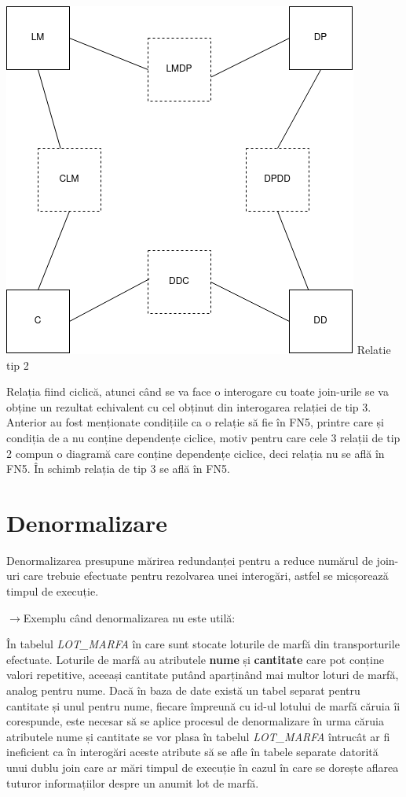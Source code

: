 \documentclass[12pt, a4paper]{article}
\begin{document}
\includegraphics[width=\textwidth]{fn5_rel_2.png}
\label{rel2}
\centering Relatie tip 2

\justifying Relația fiind ciclică, atunci când se va face o interogare cu toate join-urile se va obține un rezultat echivalent cu cel obținut din interogarea relației de tip 3. Anterior au fost menționate condițiile ca o relație să fie în FN5, printre care și condiția de a nu conține dependențe ciclice, motiv pentru care cele 3 relații de tip 2 compun o diagramă care conține dependențe ciclice, deci relația nu se află în FN5. În schimb relația de tip 3 se află în FN5.

\section{Denormalizare}
Denormalizarea presupune mărirea redundanței pentru a reduce numărul de join-uri care trebuie efectuate pentru rezolvarea unei interogări, astfel se micșorează timpul de execuție.

$\rightarrow$Exemplu când denormalizarea nu este utilă:

În tabelul \emph{LOT\_MARFA} în care sunt stocate loturile de marfă din transporturile efectuate. Loturile de marfă au atributele \textbf{nume} și \textbf{cantitate} care pot conține valori repetitive, aceeași cantitate putând aparținând mai multor loturi de marfă, analog pentru nume. Dacă în baza de date există un tabel separat pentru cantitate și unul pentru nume, fiecare împreună cu id-ul lotului de marfă căruia îi corespunde, este necesar să se aplice procesul de denormalizare în urma căruia atributele nume și cantitate se vor plasa în tabelul \emph{LOT\_MARFA} întrucât ar fi ineficient ca în interogări aceste atribute să se afle în tabele separate datorită unui dublu join care ar mări timpul de execuție în cazul în care se dorește aflarea tuturor informațiilor despre un anumit lot de marfă.
\end{document}
